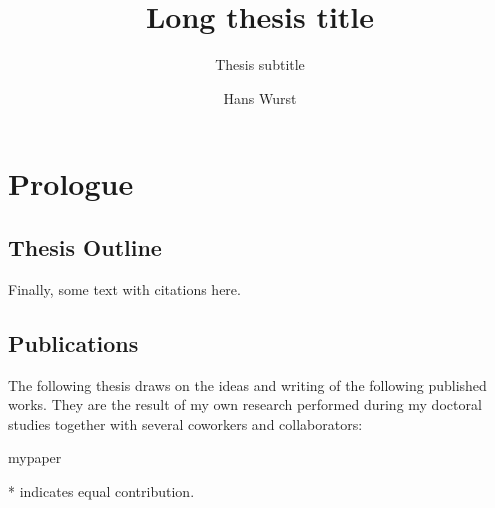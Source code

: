 \documentclass[a4paper,justified,titlepage,twoside,nobib,symmetric]{tufte-book}
\author[H. Wurst]{Hans Wurst}
\title[Short thesis title]{Long thesis title}
\subtitle{Thesis subtitle}
\begin{document}
\sloppy

\frontmatter
{} %

{}
\tableofcontents
\newpage
{}
{}
\listoffigures
{}
{}
\listoftables
{}

\mainmatter
{}

\chapter{Prologue}

\blindtext
\section{Thesis Outline}
\blindtext
Finally, some text with citations here.\cite{Abraham2015,Alam2009}

\section{Publications}
The following thesis draws on the ideas and writing of the following published
works. They are the result of my own research performed during my doctoral
studies together with several coworkers and collaborators:
\begin{refsection}
\nocite{mypapermarini2018,mypaperporro2019,mypaperjenewein2020,mypaperhauf2020,mypaperschmidt2021,mypapersaponaro2021}
\begin{refcontext}{mypaper}
\vspace{-0.5cm}
\printbibliography[keyword=mypaper,heading=none,env=nodis]
\end{refcontext}
\end{refsection}
\begin{flushright}
* indicates equal contribution.
\end{flushright}
\end{document}
